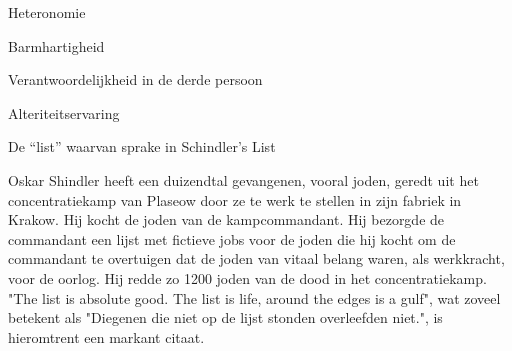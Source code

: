 \documentclass[main.tex]{subfiles}
\begin{document}
\begin{examenvraag}
    \begin{vraag}
        Heteronomie
    \end{vraag}

    \begin{antwoord}

    \end{antwoord}
\end{examenvraag}


\begin{examenvraag}
    \begin{vraag}
        Barmhartigheid
    \end{vraag}

    \begin{antwoord}

    \end{antwoord}
\end{examenvraag}


\begin{examenvraag}
    \begin{vraag}
        Verantwoordelijkheid in de derde persoon
    \end{vraag}

    \begin{antwoord}

    \end{antwoord}
\end{examenvraag}


\begin{examenvraag}
    \begin{vraag}
        Alteriteitservaring
    \end{vraag}

    \begin{antwoord}

    \end{antwoord}
\end{examenvraag}


\begin{examenvraag}
    \begin{vraag}
        De “list” waarvan sprake in Schindler’s List
    \end{vraag}

    \begin{antwoord}
        Oskar Shindler heeft een duizendtal gevangenen, vooral joden, geredt uit het concentratiekamp van Plaseow door ze te werk te stellen in zijn fabriek in Krakow.
        Hij kocht de joden van de kampcommandant.
        Hij bezorgde de commandant een lijst met fictieve jobs voor de joden die hij kocht om de commandant te overtuigen dat de joden van vitaal belang waren, als werkkracht, voor de oorlog.
        Hij redde zo 1200 joden van de dood in het concentratiekamp.
        "The list is absolute good. The list is life, around the edges is a gulf", wat zoveel betekent als "Diegenen die niet op de lijst stonden overleefden niet.", is hieromtrent een markant citaat.
    \end{antwoord}
\end{examenvraag}
\end{document}
